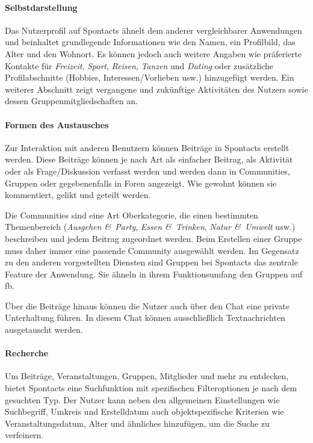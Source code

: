 \paragraph{Selbstdarstellung}

Das Nutzerprofil auf Spontacts ähnelt dem anderer vergleichbarer Anwendungen und beinhaltet grundlegende Informationen wie den Namen, ein Profilbild, das Alter und den Wohnort. Es können jedoch auch weitere Angaben wie präferierte Kontakte für \textit{Freizeit}, \textit{Sport}, \textit{Reisen}, \textit{Tanzen} und \textit{Dating} oder zusätzliche Profilabschnitte (Hobbies, Interessen/Vorlieben usw.) hinzugefügt werden. Ein weiterer Abschnitt zeigt vergangene und zukünftige Aktivitäten des Nutzers sowie dessen Gruppenmitgliedschaften an.

\paragraph{Formen des Austausches}

Zur Interaktion mit anderen Benutzern können Beiträge in Spontacts erstellt werden. Diese Beiträge können je nach Art als einfacher Beitrag, als Aktivität oder als Frage/Diskussion verfasst werden und werden dann in Communities, Gruppen oder gegebenenfalls in Foren angezeigt. Wie gewohnt können sie kommentiert, gelikt und geteilt werden.

Die Communities sind eine Art Oberkategorie, die einen bestimmten Themenbereich (\textit{Ausgehen \&\ Party}, \textit{Essen \&\ Trinken}, \textit{Natur \&\ Umwelt} usw.) beschreiben und jedem Beitrag zugeordnet werden. Beim Erstellen einer Gruppe muss daher immer eine passende Community ausgewählt werden. Im Gegensatz zu den anderen vorgestellten Diensten sind Gruppen bei Spontacts das zentrale Feature der Anwendung. Sie ähneln in ihrem Funktionsumfang den Gruppen auf \acrshort{fb}.

Über die Beiträge hinaus können die Nutzer auch über den Chat eine private Unterhaltung führen. In diesem Chat können ausschließlich Textnachrichten ausgetauscht werden.

\paragraph{Recherche}

Um Beiträge, Veranstaltungen, Gruppen, Mitglieder und mehr zu entdecken, bietet Spontacts eine Suchfunktion mit spezifischen Filteroptionen je nach dem gesuchten Typ. Der Nutzer kann neben den allgemeinen Einstellungen wie Suchbegriff, Umkreis und Erstelldatum auch objektspezifische Kriterien wie Veranstaltungsdatum, Alter und ähnliches hinzufügen, um die Suche zu verfeinern.

